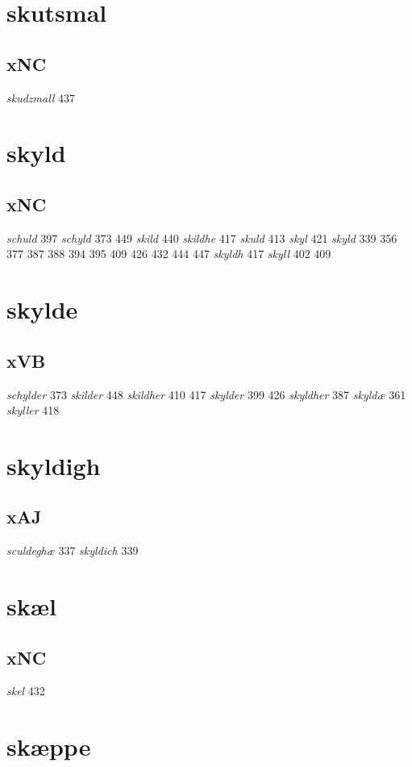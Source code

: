 \documentclass[a4paper,twocolumn]{article}
\begin{document}
\section{skutsmal}
\label{sec:orga114f12}
\subsection{xNC}
\label{sec:orgf648287}
\emph{skudzmall} 437 
\section{skyld}
\label{sec:orgdb9980e}
\subsection{xNC}
\label{sec:orgf604578}
\emph{schuld} 397 \emph{schyld} 373 449 \emph{skild} 440 \emph{skildhe} 417 \emph{skuld} 413 \emph{skyl} 421 \emph{skyld} 339 356 377 387 388 394 395 409 426 432 444 447 \emph{skyldh} 417 \emph{skyll} 402 409 
\section{skylde}
\label{sec:orgf48c805}
\subsection{xVB}
\label{sec:orgc968735}
\emph{schylder} 373 \emph{skilder} 448 \emph{skildher} 410 417 \emph{skylder} 399 426 \emph{skyldher} 387 \emph{skyldæ} 361 \emph{skyller} 418 
\section{skyldigh}
\label{sec:org9bdeea2}
\subsection{xAJ}
\label{sec:orgfcb7c78}
\emph{sculdeghæ} 337 \emph{skyldich} 339 
\section{skæl}
\label{sec:org169402c}
\subsection{xNC}
\label{sec:org45cfa8c}
\emph{skel} 432 
\section{skæppe}
\label{sec:orgb9ce2c3}
\end{document}
